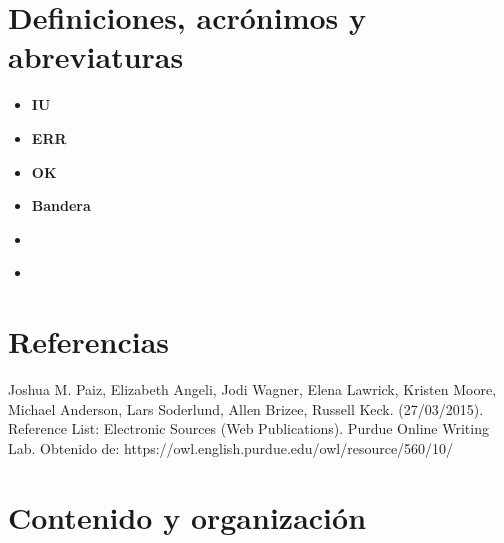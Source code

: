 \section{Definiciones, acrónimos y abreviaturas}
\begin{itemize}
\item \bfseries{IU}
\item \bfseries{ERR}
\item \bfseries{OK}
\item \bfseries{Bandera}
\item \bfseries{}
\item \bfseries{}
\end{itemize}
\section{Referencias}
Joshua M. Paiz, Elizabeth Angeli, Jodi Wagner, Elena Lawrick, Kristen Moore, Michael Anderson, Lars Soderlund, Allen Brizee, Russell Keck. (27/03/2015). Reference List: Electronic Sources (Web Publications). Purdue Online Writing Lab. Obtenido de: 
https://owl.english.purdue.edu/owl/resource/560/10/
\section{Contenido y organización}

